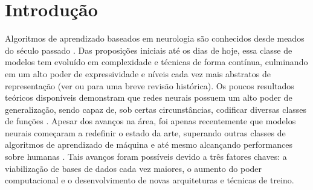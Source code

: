 \chapter{Introdução}

Algoritmos de aprendizado baseados em neurologia são conhecidos desde meados do século passado \cite{perceptron_58}. Das proposições iniciais até os dias de hoje, essa classe de modelos tem evoluído em complexidade e técnicas de forma contínua,
culminando em um alto poder de expressividade e níveis cada vez mais abstratos de representação (ver \cite{Goodfellow-et-al-2016} ou \cite{jurgenReview2015} para uma breve revisão histórica). Os poucos resultados teóricos disponíveis demonstram que redes neurais possuem um alto poder de generalização, sendo capaz de, sob certas circunstâncias, codificar diversas classes de funções \cite{Barron1993UniversalAB, Andoni2014PolyAprox}. Apesar dos avanços na área, foi apenas recentemente que modelos neurais começaram a redefinir o estado da arte, superando outras classes de algoritmos de aprendizado de máquina \cite{imagenet_2012} e até mesmo alcançando performances sobre humanas \cite{mnih2015humanlevel}. Tais avanços foram possíveis devido a três fatores chaves: a viabilização de bases de dados cada vez maiores, o aumento do poder computacional e o desenvolvimento de novas arquiteturas e técnicas de treino.

